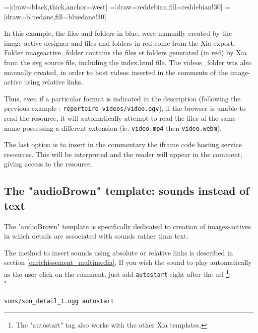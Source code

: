 =[draw=black,thick,anchor=west]
=[draw=reddebian,fill=reddebian!30]
=[draw=bluedane,fill=bluedane!30]

In this example, the files and folders in blue, were manually 
created by the image-active designer and files and folders in red come from the Xia export.
Folder \textcolor{bluedane}
{imageactive\_folder} contains the files et folders generated (in red) by Xia from the 
svg source file, including the \textcolor{reddebian}{index.html} file. The \textcolor{bluedane}
{videos\_folder} was also manually created, in order to host videos inserted 
in the comments of the image-active using relative links.


Thus, even if a particular format is indicated in the description (following 
the previous example : \verb|repertoire_videos/video.ogv|), if the browser is 
unable to read the resource, it will automatically attempt to read the files 
of the same name possessing a different extension (ie. \verb|video.mp4| 
then \verb|video.webm|).

The last option is to insert in the commentary the iframe code hosting service 
resources. This will be interpreted and the reader will appear in the comment, 
giving access to the resource.

\subsection{The "audioBrown" template: sounds instead of text}

The "audioBrown" template is specifically dedicated to creation of 
images-actives in which details are associated with sounds rather than text.

The method to insert sounds using absolute or relative links is described in 
section 
\ref{enrichissement_multimedia}. If you wish the sound to play 
automatically as the user click on the comment, just add \verb|autostart| right 
after the url \footnote{The "autostart" tag also works with the other 
Xia templates.}:\\"
\begin{center}
 \verb|sons/son_detail_1.ogg autostart|
\end{center}


